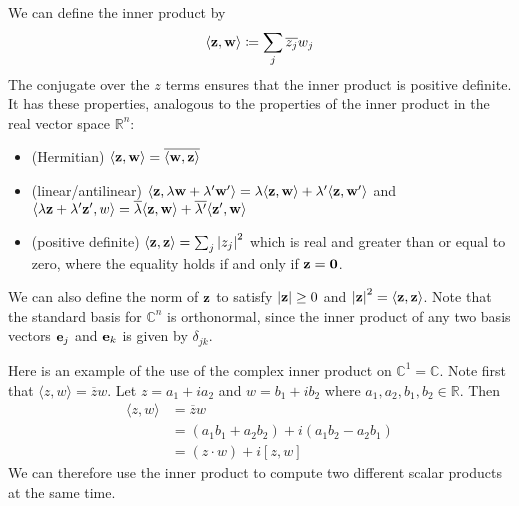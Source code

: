 We can define the inner product by
\[
	\langle \vb z, \vb w \rangle \coloneq \sum_j \overline{z_j} w_j
\]
The conjugate over the \(z\) terms ensures that the inner product is positive definite.
It has these properties, analogous to the properties of the inner product in the real vector space \(\mathbb R^n\):
\begin{itemize}
	\item (Hermitian) \(\langle \vb z, \vb w \rangle = \overline{\langle \vb w, \vb z \rangle}\)
	\item (linear/antilinear) \(\langle \vb z, \lambda \vb w + \lambda' \vb w' \rangle = \lambda \langle \vb z, \vb w \rangle + \lambda' \langle \vb z, \vb w' \rangle\) and \(\langle \lambda \vb z + \lambda' \vb z', w \rangle = \overline{\lambda} \langle \vb z, \vb w \rangle + \overline{\lambda'} \langle \vb z', \vb w \rangle\)
	\item (positive definite) \(\langle \vb z, \vb z \rangle = \sum_j \abs{z_j}^2\) which is real and greater than or equal to zero, where the equality holds if and only if \(\vb z = \vb 0\).
\end{itemize}
We can also define the norm of \(\vb z\) to satisfy \(\abs{\vb z} \geq 0\) and \(\abs{\vb z}^2 = \langle \vb z, \vb z \rangle\).
Note that the standard basis for \(\mathbb C^n\) is orthonormal, since the inner product of any two basis vectors \(\vb e_j\) and \(\vb e_k\) is given by \(\delta_{jk}\).

Here is an example of the use of the complex inner product on \(\mathbb C^1 = \mathbb C\).
Note first that \(\langle z, w \rangle = \overline z w\).
Let \(z = a_1 + ia_2\) and \(w = b_1 + ib_2\) where \(a_1, a_2, b_1, b_2 \in \mathbb R\).
Then
\begin{align*}
	\langle z, w \rangle & = \overline z w                              \\
	                     & = (a_1 b_1 + a_2 b_2) + i(a_1 b_2 - a_2 b_1) \\
	                     & = (z \cdot w) + i[z, w]
\end{align*}
We can therefore use the inner product to compute two different scalar products at the same time.
